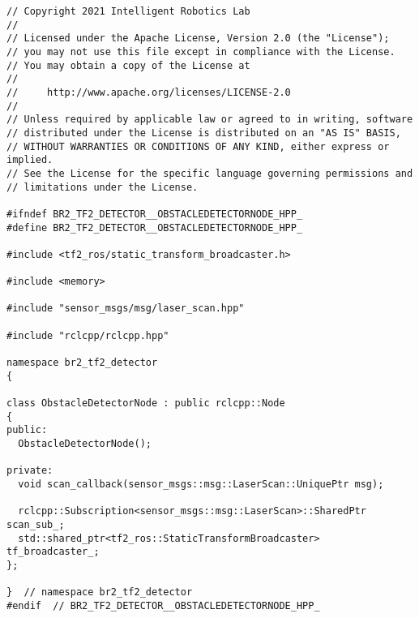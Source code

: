  \footnotesize
\begin{tcolorbox}[sharp corners, colframe=gray!80, colback=LightGray, left=0pt, top=0pt, bottom=0pt, title=\texttt{br2\_tf2\_detector/include/br2\_tf2\_detector/ObstacleDetectorNode.hpp}]
  \begin{verbatim}
// Copyright 2021 Intelligent Robotics Lab
//
// Licensed under the Apache License, Version 2.0 (the "License");
// you may not use this file except in compliance with the License.
// You may obtain a copy of the License at
//
//     http://www.apache.org/licenses/LICENSE-2.0
//
// Unless required by applicable law or agreed to in writing, software
// distributed under the License is distributed on an "AS IS" BASIS,
// WITHOUT WARRANTIES OR CONDITIONS OF ANY KIND, either express or implied.
// See the License for the specific language governing permissions and
// limitations under the License.

#ifndef BR2_TF2_DETECTOR__OBSTACLEDETECTORNODE_HPP_
#define BR2_TF2_DETECTOR__OBSTACLEDETECTORNODE_HPP_

#include <tf2_ros/static_transform_broadcaster.h>

#include <memory>

#include "sensor_msgs/msg/laser_scan.hpp"

#include "rclcpp/rclcpp.hpp"

namespace br2_tf2_detector
{

class ObstacleDetectorNode : public rclcpp::Node
{
public:
  ObstacleDetectorNode();

private:
  void scan_callback(sensor_msgs::msg::LaserScan::UniquePtr msg);

  rclcpp::Subscription<sensor_msgs::msg::LaserScan>::SharedPtr scan_sub_;
  std::shared_ptr<tf2_ros::StaticTransformBroadcaster> tf_broadcaster_;
};

}  // namespace br2_tf2_detector
#endif  // BR2_TF2_DETECTOR__OBSTACLEDETECTORNODE_HPP_
    \end{verbatim}
    \end{tcolorbox}
  \normalsize

